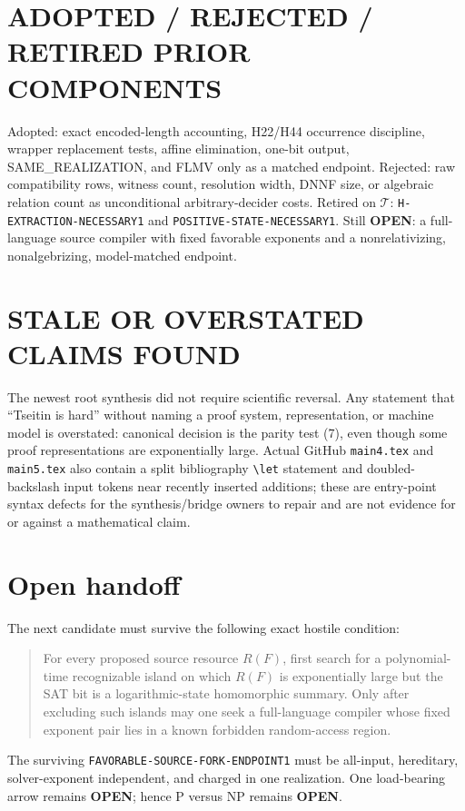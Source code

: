 \documentclass[11pt]{article}
\newcommand{\OPEN}{\textbf{OPEN}}
\begin{document}
\section{ADOPTED / REJECTED / RETIRED PRIOR COMPONENTS}

Adopted: exact encoded-length accounting, H22/H44 occurrence discipline, wrapper replacement tests, affine elimination, one-bit output, SAME\_REALIZATION, and FLMV only as a matched endpoint.  Rejected: raw compatibility rows, witness count, resolution width, DNNF size, or algebraic relation count as unconditional arbitrary-decider costs.  Retired on $\mathcal T$: \texttt{H-EXTRACTION-NECESSARY1} and \texttt{POSITIVE-STATE-NECESSARY1}.  Still \OPEN: a full-language source compiler with fixed favorable exponents and a nonrelativizing, nonalgebrizing, model-matched endpoint.

\section{STALE OR OVERSTATED CLAIMS FOUND}

The newest root synthesis did not require scientific reversal.  Any statement that ``Tseitin is hard'' without naming a proof system, representation, or machine model is overstated: canonical decision is the parity test (7), even though some proof representations are exponentially large.  Actual GitHub \texttt{main4.tex} and \texttt{main5.tex} also contain a split bibliography \verb|\let| statement and doubled-backslash input tokens near recently inserted additions; these are entry-point syntax defects for the synthesis/bridge owners to repair and are not evidence for or against a mathematical claim.

\section{Open handoff}

The next candidate must survive the following exact hostile condition:
\begin{quote}
For every proposed source resource $R(F)$, first search for a polynomial-time recognizable island on which $R(F)$ is exponentially large but the SAT bit is a logarithmic-state homomorphic summary.  Only after excluding such islands may one seek a full-language compiler whose fixed exponent pair lies in a known forbidden random-access region.
\end{quote}
The surviving \texttt{FAVORABLE-SOURCE-FORK-ENDPOINT1} must be all-input, hereditary, solver-exponent independent, and charged in one realization.  One load-bearing arrow remains \OPEN; hence P versus NP remains \OPEN.
\end{document}
